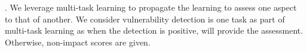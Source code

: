 \vspace{1pt}
. We leverage multi-task learning to
propagate the learning to assess one aspect to that of another.
We consider vulnerability detection is one task as part of
multi-task learning as when the detection is positive, {\tool}
will provide the assessment. Otherwise, non-impact scores are given.



